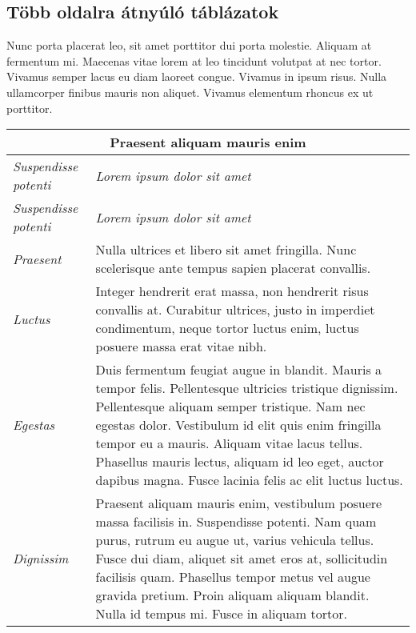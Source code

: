 \subsection{Több oldalra átnyúló táblázatok}

Nunc porta placerat leo, sit amet porttitor dui porta molestie. Aliquam at fermentum mi. Maecenas vitae lorem at leo tincidunt volutpat at nec tortor. Vivamus semper lacus eu diam laoreet congue. Vivamus in ipsum risus. Nulla ullamcorper finibus mauris non aliquet. Vivamus elementum rhoncus ex ut porttitor.

\begin{center}
	\begin{longtable}{ | p{} | p{} | }

		\hline
		\multicolumn{2}{|c|}{\textbf{Praesent aliquam mauris enim}}
		\\ \hline

		\emph{Suspendisse potenti} & \emph{Lorem ipsum dolor sit amet}
		\\ \hline \hline
		\endfirsthead %

		\hline
		\emph{Suspendisse potenti} & \emph{Lorem ipsum dolor sit amet}
		\\ \hline \hline
		\endhead %

		\hline
		\endfoot %

		\endlastfoot %

		\emph{Praesent}
		& Nulla ultrices et libero sit amet fringilla. Nunc scelerisque ante tempus sapien placerat convallis.
		\\ \hline

		\emph{Luctus}
		& Integer hendrerit erat massa, non hendrerit risus convallis at. Curabitur ultrices, justo in imperdiet condimentum, neque tortor luctus enim, luctus posuere massa erat vitae nibh.
		\\ \hline

		\emph{Egestas}
		& Duis fermentum feugiat augue in blandit. Mauris a tempor felis. Pellentesque ultricies tristique dignissim. Pellentesque aliquam semper tristique. Nam nec egestas dolor. Vestibulum id elit quis enim fringilla tempor eu a mauris. Aliquam vitae lacus tellus. Phasellus mauris lectus, aliquam id leo eget, auctor dapibus magna. Fusce lacinia felis ac elit luctus luctus.
		\\ \hline

		\emph{Dignissim}
		& Praesent aliquam mauris enim, vestibulum posuere massa facilisis in. Suspendisse potenti. Nam quam purus, rutrum eu augue ut, varius vehicula tellus. Fusce dui diam, aliquet sit amet eros at, sollicitudin facilisis quam. Phasellus tempor metus vel augue gravida pretium. Proin aliquam aliquam blandit. Nulla id tempus mi. Fusce in aliquam tortor.
		\\ \hline


\end{longtable}
\end{center}

